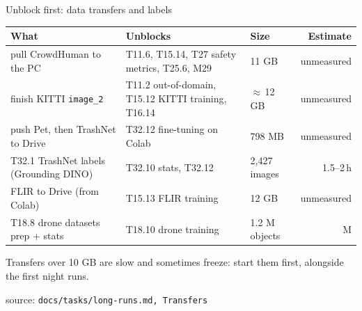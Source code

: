 \documentclass[aspectratio=169,11pt]{beamer}
\newcommand\src[1]{\par\vfill{\tiny\color{gray}source: \texttt{#1}}}
\begin{document}
\begin{frame}{Unblock first: data transfers and labels}
  \footnotesize
  \begin{tabularx}{\linewidth}{@{}l>{\raggedright\arraybackslash}Xlr@{}}
    \toprule
    What & Unblocks & Size & Estimate \\
    \midrule
    pull CrowdHuman to the PC & T11.6, T15.14, T27 safety metrics, T25.6, M29 & 11 GB & unmeasured \\
    finish KITTI \texttt{image\_2} & T11.2 out-of-domain, T15.12 KITTI training, T16.14 & $\approx$\,12 GB & unmeasured \\
    push Pet, then TrashNet to Drive & T32.12 fine-tuning on Colab & 798 MB & unmeasured \\
    T32.1 TrashNet labels (Grounding DINO) & T32.10 stats, T32.12 & 2,427 images & 1.5--2\,h \\
    FLIR to Drive (from Colab) & T15.13 FLIR training & 12 GB & unmeasured \\
    T18.8 drone datasets prep + stats & T18.10 drone training & 1.2 M objects & M \\
    \bottomrule
  \end{tabularx}

  \medskip\small
  Transfers over 10 GB are slow and sometimes freeze: start them first, alongside the
  first night runs.
  \src{docs/tasks/long-runs.md, Transfers}
\end{frame}
\end{document}
